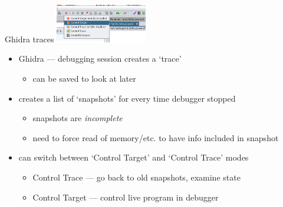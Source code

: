 \begin{frame}{Ghidra traces}
\includegraphics[width=0.3\textwidth]{../re-tools/ghidra-control-target.png}
    \begin{itemize}
    \item Ghidra --- debugging session creates a `trace'
        \begin{itemize}
        \item can be saved to look at later
        \end{itemize}
    \item creates a list of `snapshots' for every time debugger stopped
        \begin{itemize}
        \item snapshots are \textit{incomplete}
        \item need to force read of memory/etc. to have info included in snapshot
        \end{itemize}
    \item can switch between `Control Target' and `Control Trace' modes
        \begin{itemize}
        \item Control Trace --- go back to old snapshots, examine state
        \item Control Target --- control live program in debugger
        \end{itemize}
    \end{itemize}
\end{frame}

